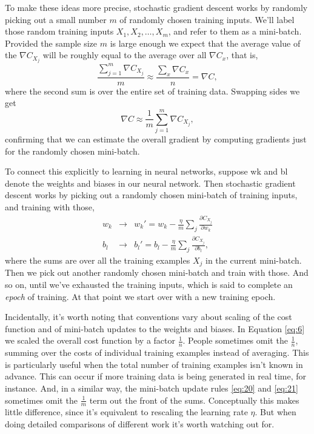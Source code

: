 \documentclass[a4paper,twoside,10pt]{book}
\begin{document}
To make these ideas more precise, stochastic gradient descent works by randomly picking out a small number $m$ of randomly chosen training inputs. We'll label those random training inputs $X_1,X_2,\ldots,X_m$, and refer to them as a mini-batch. Provided the sample size $m$ is large enough we expect that the average value of the $\nabla C_{X_j}$ will be roughly equal to the average over all $\nabla C_x$, that is,
\begin{equation}
	\frac{\sum_{j=1}^m \nabla C_{X_{j}}}{m} \approx \frac{\sum_x \nabla C_x}{n} = \nabla C,
	\label{eq:18}
\end{equation}
where the second sum is over the entire set of training data. Swapping sides we get
\begin{equation}
\nabla C \approx \frac{1}{m} \sum_{j=1}^m \nabla C_{X_{j}},
	\label{eq:19}
\end{equation}
confirming that we can estimate the overall gradient by computing gradients just for the randomly chosen mini-batch.

To connect this explicitly to learning in neural networks, suppose wk and bl denote the weights and biases in our neural network. Then stochastic gradient descent works by picking out a randomly chosen mini-batch of training inputs, and training with those,
\begin{eqnarray} 
w_k & \rightarrow & w_k' = w_k-\frac{\eta}{m} \sum_j \frac{\partial C_{X_j}}{\partial w_k}\label{eq:20}\\
b_l & \rightarrow & b_l' = b_l-\frac{\eta}{m} \sum_j \frac{\partial C_{X_j}}{\partial b_l}\label{eq:21},
\end{eqnarray}
where the sums are over all the training examples $X_j$ in the current mini-batch. Then we pick out another randomly chosen mini-batch and train with those. And so on, until we've exhausted the training inputs, which is said to complete an \textit{epoch} of training. At that point we start over with a new training epoch.

Incidentally, it's worth noting that conventions vary about scaling of the cost function and of mini-batch updates to the weights and biases. In Equation \ref{eq:6} we scaled the overall cost function by a factor $\frac1n$. People sometimes omit the $\frac1n$, summing over the costs of individual training examples instead of averaging. This is particularly useful when the total number of training examples isn't known in advance. This can occur if more training data is being generated in real time, for instance. And, in a similar way, the mini-batch update rules \ref{eq:20} and \ref{eq:21} sometimes omit the $\frac1m$ term out the front of the sums. Conceptually this makes little difference, since it's equivalent to rescaling the learning rate $\eta$. But when doing detailed comparisons of different work it's worth watching out for.
\end{document}
